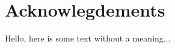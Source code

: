 \documentclass[../main.tex]{subfiles}
\begin{document}
\section{Acknowlegdements}

Hello, here is some text without a meaning...

\end{document}
